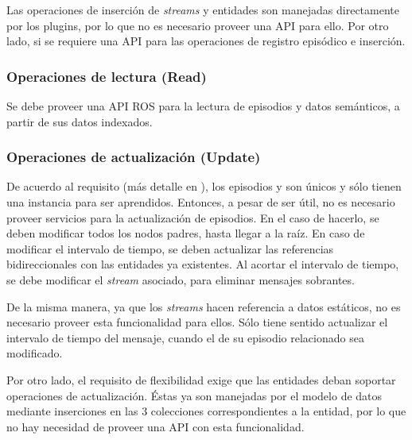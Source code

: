  Las operaciones de inserción de \textit{streams} y entidades son manejadas directamente por los plugins, por lo que no es necesario proveer una API para ello. Por otro lado, si se requiere una API para las operaciones de registro episódico e inserción.

\subsubsection{Operaciones de lectura (Read)}

Se debe proveer una API ROS para la lectura de episodios y datos semánticos, a partir de sus datos indexados.








\subsubsection{Operaciones de actualización (Update)}

De acuerdo al requisito  (más detalle en ), los episodios y son únicos y sólo tienen una instancia para ser aprendidos. Entonces, a pesar de ser útil, no es necesario proveer servicios para la actualización de episodios. En el caso de hacerlo, se deben modificar todos los nodos padres, hasta llegar a la raíz. En caso de modificar el intervalo de tiempo, se deben actualizar las referencias bidireccionales con las entidades ya existentes. Al acortar el intervalo de tiempo, se debe modificar el \textit{stream} asociado, para eliminar mensajes sobrantes.

 De la misma manera, ya que los \textit{streams} hacen referencia a datos estáticos, no es necesario proveer esta funcionalidad para ellos. Sólo tiene sentido actualizar el intervalo de tiempo del mensaje, cuando el de su episodio relacionado sea modificado.

Por otro lado, el requisito de flexibilidad  exige que las entidades deban soportar operaciones de actualización. Éstas ya son manejadas por el modelo de datos mediante inserciones en las 3 colecciones correspondientes a la entidad, por lo que no hay necesidad de proveer una API con esta funcionalidad.

